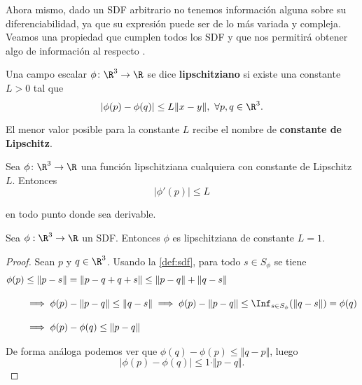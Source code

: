 Ahora mismo, dado un SDF arbitrario no tenemos información alguna sobre su diferenciabilidad, ya que su expresión puede ser de lo más variada y compleja. Veamos una propiedad que cumplen todos los SDF y que nos permitirá obtener algo de información al respecto \cite{lips} \cite{derivWiki}.

\begin{definicion}
    Una campo escalar $\phi\colon \R^3 \to \R$ se dice \textbf{lipschitziano} si existe una constante $L>0$ tal que
    \begin{equation*}
        \vert \phi(p)-\phi(q)\vert \le L\Vert x-y\Vert,\ \forall p,q\in \R^3.
    \end{equation*}

    El menor valor posible para la constante $L$ recibe el nombre de \textbf{constante de Lipschitz}.
\end{definicion}

\begin{proposicion}
    Sea $\phi\colon \R^3 \to \R$ una función lipschitziana cualquiera con constante de Lipschitz $L$. Entonces
    \begin{equation*}
        \vert \phi'(p)\vert \le L
    \end{equation*}

    en todo punto donde sea derivable.
\end{proposicion}
\begin{lema}
    Sea $\phi:\R^3\to \R$ un SDF. Entonces $\phi$ es lipschitziana de constante $L=1$.
\end{lema}
\begin{proof}
    Sean $p$ y $q\in \R^3$. Usando la \autoref{def:sdf}, para todo $s\in S_{\phi}$ se tiene
    \begin{align*}
        \phi(p) &\le \Vert p-s\Vert = \Vert p-q+q+s\Vert \le \Vert p-q\Vert + \Vert q-s\Vert\\[10pt] 
        &\implies \phi(p) - \Vert p-q\Vert \le \Vert q-s \Vert \implies  \phi(p) - \Vert p-q\Vert \le \Inf_{s\in S_{\phi}}(\Vert q-s \Vert) = \phi(q)\\[10pt]
        &\implies \phi(p) - \phi(q) \le \Vert p-q \Vert
    \end{align*}

    De forma análoga podemos ver que $\phi(q) - \phi(p) \le \Vert q-p \Vert$, luego
    \begin{equation*}
        \vert \phi(p) - \phi(q)\vert \le 1\cdot \Vert p-q\Vert.
    \end{equation*}
\end{proof}

